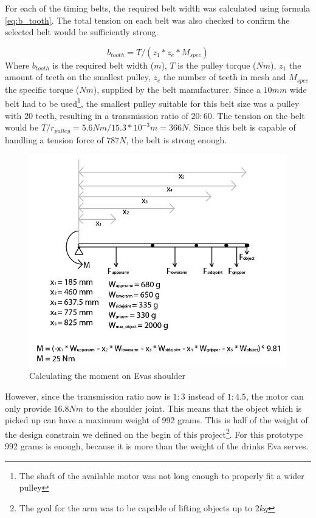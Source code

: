 \documentclass[technical_document.tex]{subfiles}
\begin{document}
For each of the timing belts, the required belt width was calculated using formula \ref{eq:b_tooth}. The total tension on each belt was also checked to confirm the selected belt would be sufficiently strong.

\begin{equation}
\label{eq:b_tooth}
b_{tooth} = T/(z_{1}*z_{e}*M_{spec})
\end{equation}
Where $b_{tooth}$ is the required belt width ($m$), $T$ is the pulley torque ($Nm$), $z_{1}$ the amount of teeth on the smallest pulley, $z_{e}$ the number of teeth in mesh and $M_{spec}$ the specific torque ($Nm$), supplied by the belt manufacturer. Since a $10mm$ wide belt had to be used\footnote{The shaft of the available motor was not long enough to properly fit a wider pulley}, the smallest pulley suitable for this belt size was a pulley with 20 teeth, resulting in a transmission ratio of $20:60$. The tension on the belt would be $T / r_{pulley} = 5.6Nm / 15.3*10^{-3}m = 366N$. Since this belt is capable of handling a tension force of $787N$, the belt is strong enough.

\begin{figure}[ht!]
	\centering
	\mbox{\includegraphics[scale=0.5]{Images/driveTrain_shoulder.png}}
	\caption{Calculating the moment on Eva\textquotesingle{}s shoulder}
	\label{fig:driveTrain_shoulder}
\end{figure}

However, since the transmission ratio now is $1:3$ instead of $1:4.5$, the motor can only provide $16.8Nm$ to the shoulder joint. This means that the object which is picked up can have a maximum weight of 992 grams. This is half of the weight of the design constrain we defined on the begin of this project\footnote{The goal for the arm was to be capable of lifting objects up to $2kg$}. For this prototype 992 grams is enough, because it is more than the weight of the drinks Eva serves.
\end{document}
